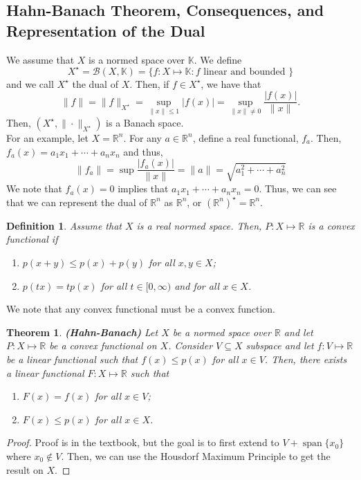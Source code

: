 \documentclass[12pt]{article}
\newtheorem{theorem}{Theorem}
\newtheorem{definition}{Definition}
\newcommand{\R}{{\mathbb R}}
\def\K{\mathbb{K}}
\newcommand{\B}{\mathscr{B}}
\newcommand{\sse}{\subseteq}
\newcommand{\Xs}{X^{\star}}
\DeclareMathOperator*{\spa}{span}
\begin{document}
\subsection*{Hahn-Banach Theorem, Consequences, and Representation of the Dual}
We assume that $X$ is a normed space over $\K$. We define 
\[ \Xs = \B(X, \K) = \{ f: X \mapsto \K : f \text{ linear and bounded } \}\]
and we call $\Xs$ the dual of $X$. Then, if $f \in \Xs$, we have that 
\[ \| f \| = \| f \|_{\Xs} = \sup\limits_{\| x \| \leq 1} |f(x)| = \sup\limits_{\| x \| \neq 0 } \frac{|f(x)|}{\| x \|}.\]
Then, $(\Xs, \| \cdot \|_{\Xs})$ is a Banach space. \\
\indent For an example, let $X = \R^n$. For any $a \in \R^n$, define a real functional, $f_a$. Then, $f_a(x) = a_1 x_1 + \cdots + a_n x_n$ and thus, 
\[\| f_a \| = \sup \frac{|f_a(x)|}{\| x \|} = \| a \| = \sqrt{a_1^2 + \cdots + a_n^2}\]
We note that $f_a(x) = 0$ implies that $a_1 x_1 + \cdots + a_n x_n = 0$. Thus, we can see that we can represent the dual of $\R^n$ as $\R^n$, or $\left( \R^n \right)^{\star} = \R^n$. 
\begin{definition}
Assume that $X$ is a real normed space. Then, $P: X \mapsto \R$ is a convex functional if 
\begin{enumerate}[topsep=-15pt, itemsep=0pt]
\item[(i)] $p(x + y) \leq p(x) + p(y) $ for all $x, y \in X$;
\item[(ii)] $p(tx) = tp(x)$ for all $t \in [0, \infty)$ and for all $x \in X$.
\end{enumerate}
\end{definition}
\vspace{-20pt}
We note that any convex functional must be a convex function.
\begin{theorem}\textbf{(Hahn-Banach)} 
Let $X$ be a normed space over $\R$ and let $P: X \mapsto \R$ be a convex functional on $X$. Consider $V \sse X$ subspace and let $f: V \mapsto \R$ be a linear functional such that $f(x) \leq p(x)$ for all $x \in V$. Then, there exists a linear functional $F: X \mapsto \R$ such that 
\begin{enumerate}[topsep=-15pt, itemsep=0pt]
\item[(i)] $F(x) = f(x)$ for all $x \in V$;
\item[(ii)] $F(x) \leq p(x)$ for all $x \in X$. 
\end{enumerate}
\end{theorem}
\vspace{-25pt}
\begin{proof}
Proof is in the textbook, but the goal is to first extend to $V + \spa\{ x_0 \}$ where $x_0 \not\in V$. Then, we can use the Housdorf Maximum Principle to get the result on $X$. 
\end{proof}
\end{document}
